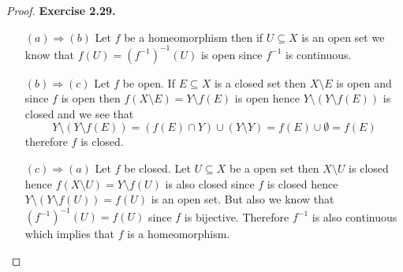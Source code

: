 \documentclass[11pt]{article}
\theoremstyle{definition}
\begin{document}
\cleardoublepage
\begin{proof}{\textbf{Exercise 2.29.}}
\begin{itemize}
    \item [$(a) \Rightarrow (b)$] Let $f$ be a homeomorphism then if
    $U \subseteq X$ is an open set we know that $f(U) = (f^{-1})^{-1}(U)$ is
    open since $f^{-1}$ is continuous.
    \item [$(b) \Rightarrow (c)$] Let $f$ be open. If $E \subseteq X$ is a
    closed set then $X \setminus E$ is open and since $f$ is open
    then $f(X \setminus E) = Y \setminus f(E)$ is open hence
    $Y \setminus (Y \setminus f(E))$ is closed and we see that
    $$Y \setminus (Y \setminus f(E))
    = (f(E) \cap Y) \cup (Y \setminus Y)
    = f(E) \cup \emptyset = f(E)$$
    therefore $f$ is closed.
    \item [$(c) \Rightarrow (a)$] Let $f$ be closed. Let $U \subseteq X$ be a
    open set then $X \setminus U$ is closed hence
    $f(X \setminus U) = Y \setminus f(U)$ is also closed since $f$ is closed
    hence $Y \setminus (Y \setminus f(U)) = f(U)$ is an open set. But also we
    know that $(f^{-1})^{-1}(U) = f(U)$ since $f$ is bijective. Therefore
    $f^{-1}$ is also continuous which implies that $f$ is a homeomorphism.   
\end{itemize}
\end{proof}
\cleardoublepage
\end{document}
